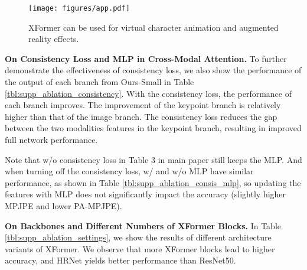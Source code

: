 \documentclass{article}
\newcommand\mypara[1]{\noindent\textbf{#1}}
\begin{document}
\begin{figure*}[t]
 \centering
  \texttt{[image: figures/app.pdf]}
  \caption{XFormer can be used for virtual character animation and augmented reality effects.}
  \label{fig:app}
\end{figure*}

\mypara{On Consistency Loss and MLP in Cross-Modal Attention.} 
To further demonstrate the effectiveness of consistency loss, we also show the performance of the output of each branch from Ours-Small in Table \ref{tbl:supp_ablation_consistency}.
With the consistency loss, the performance of each branch improves. The improvement of the keypoint branch is relatively higher than that of the image branch.
The consistency loss reduces the gap between the two modalities features in the keypoint branch, resulting in improved full network performance.

Note that w/o consistency loss in Table 3 in main paper still keeps the MLP. 
And when turning off the consistency loss, w/ and w/o MLP have similar performance, as shown in Table \ref{tbl:supp_ablation_consis_mlp}, so updating the features with MLP does not significantly impact the accuracy (slightly higher MPJPE and lower PA-MPJPE).


\begin{table}[h]
\small
\renewcommand{\tabcolsep}{1pt}
\centering
{
}
\caption{
Ablation study on MLP in cross-modal attention module.
}
\label{tbl:supp_ablation_consis_mlp}
\end{table}


\mypara{On Backbones and Different Numbers of XFormer Blocks.} 
In Table \ref{tbl:supp_ablation_settings}, we show the results of different architecture variants of XFormer. We observe that more XFormer blocks lead to higher accuracy, and HRNet yields better performance than ResNet50.
\end{document}
